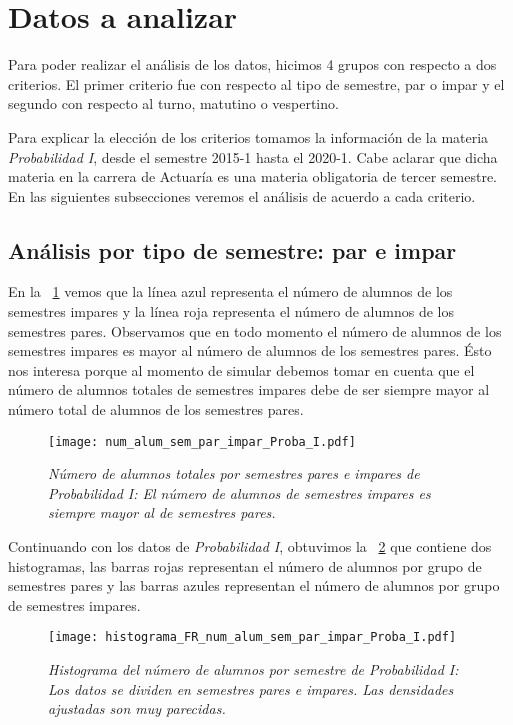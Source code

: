 \section{Datos a analizar} \label{DatosAnalizar}

Para poder realizar el análisis de los datos, hicimos 4 grupos con respecto a dos criterios. El primer criterio fue con respecto al tipo de semestre, par o impar y el segundo con respecto al turno, matutino o vespertino.

Para explicar la elección de los criterios tomamos la información de la materia \textit{Probabilidad I}, desde el semestre 2015-1 hasta el 2020-1. Cabe aclarar que dicha materia en la carrera de Actuaría es una materia obligatoria de tercer semestre. En las siguientes subsecciones veremos el análisis de acuerdo a cada criterio.

\subsection{Análisis por tipo de semestre: par e impar}

En la \figurename{~\ref{ParImparProbaI}} vemos que la línea azul representa el número de alumnos de los semestres impares y la línea roja representa el número de alumnos de los semestres pares. Observamos que en todo momento el número de alumnos de los semestres impares es mayor al número de alumnos de los semestres pares. Ésto nos interesa porque al momento de simular debemos tomar en cuenta que el número de alumnos totales de semestres impares debe de ser siempre mayor al número total de alumnos de los semestres pares.

\begin{figure}[H]
\centering
\texttt{[image: num\_alum\_sem\_par\_impar\_Proba\_I.pdf]} %
\caption[\textit{Número de alumnos totales por semestres pares e impares: Probabilidad I}]{\textit{Número de alumnos totales por semestres pares e impares de Probabilidad I: El número de alumnos de semestres impares es siempre mayor al de semestres pares.}}\label{ParImparProbaI}
\end{figure}

Continuando con los datos de \textit{Probabilidad I}, obtuvimos la \figurename{~\ref{HistAlumParImparProbaI}} que contiene dos histogramas, las barras rojas representan el número de alumnos por grupo de semestres pares y las barras azules representan el número de alumnos por grupo de semestres impares.

\begin{figure}[H]
\centering
\texttt{[image: histograma\_FR\_num\_alum\_sem\_par\_impar\_Proba\_I.pdf]} %
\caption[\textit{Histograma del número de alumnos por semestre: Probabilidad I}]{\textit{Histograma del número de alumnos por semestre  de Probabilidad I: Los datos se dividen en semestres pares e impares. Las densidades ajustadas son muy parecidas.}}\label{HistAlumParImparProbaI}
\end{figure}

